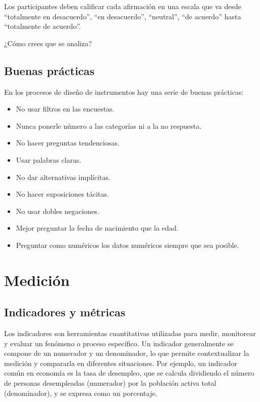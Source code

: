 \documentclass[
  letterpaper,
  DIV=11,
  numbers=noendperiod]{scrreprt}
\providecommand{\tightlist}{%
  \setlength{\itemsep}{0pt}\setlength{\parskip}{0pt}}\usepackage{longtable,booktabs,array}
\begin{document}
Los participantes deben calificar cada afirmación en una escala que va
desde ``totalmente en desacuerdo'', ``en desacuerdo'', ``neutral'', ``de
acuerdo'' hasta ``totalmente de acuerdo''.

¿Cómo crees que se analiza?

\section{Buenas prácticas}\label{buenas-pruxe1cticas}

En los procesos de diseño de instrumentos hay una serie de buenas
prácticas:

\begin{itemize}
\tightlist
\item
  No usar filtros en las encuestas.
\item
  Nunca ponerle número a las categorías ni a la no respuesta.
\item
  No hacer preguntas tendenciosas.
\item
  Usar palabras claras.
\item
  No dar alternativas implícitas.
\item
  No hacer suposiciones tácitas.
\item
  No usar dobles negaciones.
\item
  Mejor preguntar la fecha de nacimiento que la edad.
\item
  Preguntar como numéricos los datos numéricos siempre que sea posible.
\end{itemize}


\chapter{Medición}\label{mediciuxf3n}

\section{Indicadores y métricas}\label{indicadores-y-muxe9tricas}

Los indicadores son herramientas cuantitativas utilizadas para medir,
monitorear y evaluar un fenómeno o proceso específico. Un indicador
generalmente se compone de un numerador y un denominador, lo que permite
contextualizar la medición y compararla en diferentes situaciones. Por
ejemplo, un indicador común en economía es la tasa de desempleo, que se
calcula dividiendo el número de personas desempleadas (numerador) por la
población activa total (denominador), y se expresa como un porcentaje.
\end{document}
